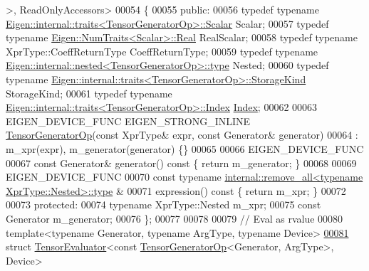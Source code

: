 \begin{DoxyCode}
      >, ReadOnlyAccessors>
00054 \{
00055   \textcolor{keyword}{public}:
00056   \textcolor{keyword}{typedef} \textcolor{keyword}{typename} \hyperlink{struct_eigen_1_1internal_1_1traits}{Eigen::internal::traits<TensorGeneratorOp>::Scalar}
       Scalar;
00057   \textcolor{keyword}{typedef} \textcolor{keyword}{typename} \hyperlink{group___sparse_core___module}{Eigen::NumTraits<Scalar>::Real} RealScalar;
00058   \textcolor{keyword}{typedef} \textcolor{keyword}{typename} XprType::CoeffReturnType CoeffReturnType;
00059   \textcolor{keyword}{typedef} \textcolor{keyword}{typename} \hyperlink{class_eigen_1_1internal_1_1_tensor_lazy_evaluator_writable}{Eigen::internal::nested<TensorGeneratorOp>::type}
       Nested;
00060   \textcolor{keyword}{typedef} \textcolor{keyword}{typename} \hyperlink{struct_eigen_1_1internal_1_1traits}{Eigen::internal::traits<TensorGeneratorOp>::StorageKind}
       StorageKind;
00061   \textcolor{keyword}{typedef} \textcolor{keyword}{typename} \hyperlink{struct_eigen_1_1internal_1_1traits}{Eigen::internal::traits<TensorGeneratorOp>::Index}
       \hyperlink{namespace_eigen_a62e77e0933482dafde8fe197d9a2cfde}{Index};
00062 
00063   EIGEN\_DEVICE\_FUNC EIGEN\_STRONG\_INLINE \hyperlink{class_eigen_1_1_tensor_generator_op}{TensorGeneratorOp}(\textcolor{keyword}{const} XprType& expr, \textcolor{keyword}{const} 
      Generator& generator)
00064       : m\_xpr(expr), m\_generator(generator) \{\}
00065 
00066     EIGEN\_DEVICE\_FUNC
00067     \textcolor{keyword}{const} Generator& generator()\textcolor{keyword}{ const }\{ \textcolor{keywordflow}{return} m\_generator; \}
00068 
00069     EIGEN\_DEVICE\_FUNC
00070     \textcolor{keyword}{const} \textcolor{keyword}{typename} \hyperlink{group___sparse_core___module}{internal::remove\_all<typename XprType::Nested>::type}
      &
00071     expression()\textcolor{keyword}{ const }\{ \textcolor{keywordflow}{return} m\_xpr; \}
00072 
00073   \textcolor{keyword}{protected}:
00074     \textcolor{keyword}{typename} XprType::Nested m\_xpr;
00075     \textcolor{keyword}{const} Generator m\_generator;
00076 \};
00077 
00078 
00079 \textcolor{comment}{// Eval as rvalue}
00080 \textcolor{keyword}{template}<\textcolor{keyword}{typename} Generator, \textcolor{keyword}{typename} ArgType, \textcolor{keyword}{typename} Device>
\hyperlink{struct_eigen_1_1_tensor_evaluator_3_01const_01_tensor_generator_op_3_01_generator_00_01_arg_type_01_4_00_01_device_01_4}{00081} \textcolor{keyword}{struct }\hyperlink{struct_eigen_1_1_tensor_evaluator}{TensorEvaluator}<const \hyperlink{class_eigen_1_1_tensor_generator_op}{TensorGeneratorOp}<Generator, ArgType>, Device>

\end{DoxyCode}
